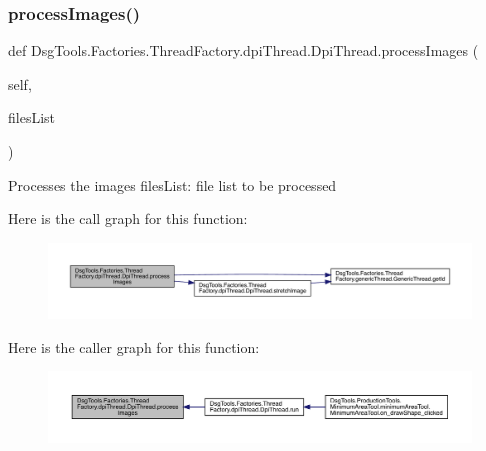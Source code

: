 \subsubsection{\texorpdfstring{process\+Images()}{processImages()}}
{\footnotesize\ttfamily def Dsg\+Tools.\+Factories.\+Thread\+Factory.\+dpi\+Thread.\+Dpi\+Thread.\+process\+Images (\begin{DoxyParamCaption}\item[{}]{self,  }\item[{}]{files\+List }\end{DoxyParamCaption})}

\begin{DoxyVerb}Processes the images
filesList: file list to be processed
\end{DoxyVerb}
 Here is the call graph for this function\+:
\nopagebreak
\begin{figure}[H]
\begin{center}
\leavevmode
\includegraphics[width=350pt]{class_dsg_tools_1_1_factories_1_1_thread_factory_1_1dpi_thread_1_1_dpi_thread_ada159a45dc2a9b778a75e1cc8756293a_cgraph}
\end{center}
\end{figure}
Here is the caller graph for this function\+:
\nopagebreak
\begin{figure}[H]
\begin{center}
\leavevmode
\includegraphics[width=350pt]{class_dsg_tools_1_1_factories_1_1_thread_factory_1_1dpi_thread_1_1_dpi_thread_ada159a45dc2a9b778a75e1cc8756293a_icgraph}
\end{center}
\end{figure}
\mbox{\label{class_dsg_tools_1_1_factories_1_1_thread_factory_1_1dpi_thread_1_1_dpi_thread_a2ef6dd0533f1f3e9b3ffc0e83c2608c0}} 
